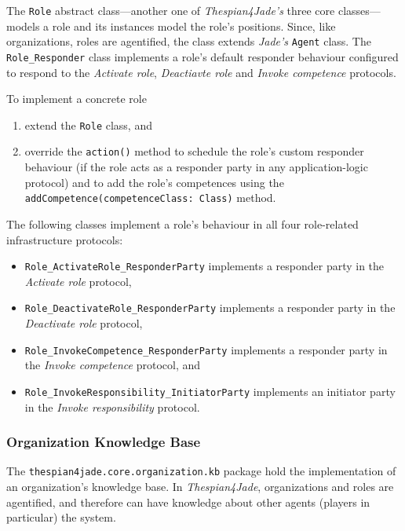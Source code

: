 The \texttt{Role} abstract class---another one of \textit{Thespian4Jade's} three core classes---models a role and its instances model the role's positions.
Since, like organizations, roles are agentified, the class extends \textit{Jade's} \texttt{Agent} class.
The \texttt{Role\_Responder} class implements a role's default responder behaviour configured to respond to the \textit{Activate role}, \textit{Deactiavte role} and \textit{Invoke competence} protocols.

To implement a concrete role
\begin{enumerate}
	\item extend the \texttt{Role} class, and
	\item override the \texttt{action()} method to schedule the role's custom responder behaviour (if the role acts as a responder party in any application-logic protocol) and to add the role's competences using the \texttt{addCompetence(competenceClass: Class)} method.	
\end{enumerate}

The following classes implement a role's behaviour in all four role-related infrastructure protocols:
\begin{itemize}
	\item \texttt{Role\_ActivateRole\_ResponderParty} implements a responder party in the \textit{Activate role} protocol,
	\item \texttt{Role\_DeactivateRole\_ResponderParty} implements a responder party in the \textit{Deactivate role} protocol,
	\item \texttt{Role\_InvokeCompetence\_ResponderParty} implements a responder party in the \textit{Invoke competence} protocol, and
	\item \texttt{Role\_InvokeResponsibility\_InitiatorParty} implements an initiator party in the \textit{Invoke responsibility} protocol.
\end{itemize}

\subsubsection{Organization Knowledge Base}

The \texttt{thespian4jade.core.organization.kb} package hold the implementation of an organization's knowledge base.
In \textit{Thespian4Jade}, organizations and roles are agentified, and therefore can have knowledge about other agents (players in particular) the system.

